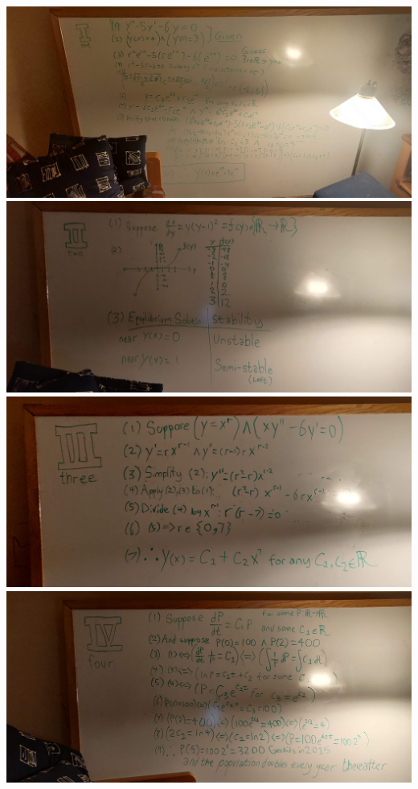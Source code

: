 \documentclass{article}
\begin{document}
\includegraphics[scale=0.075]{1.jpg}
\includegraphics[scale=0.075]{2.jpg}
\includegraphics[scale=0.075]{3.jpg}
\includegraphics[scale=0.075]{4.jpg}
\end{document}
